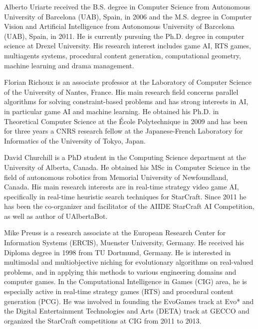 \documentclass[journal]{IEEEtran}
\begin{document}
\begin{IEEEbiographynophoto}{Alberto Uriarte}
received the B.S. degree in Computer Science from Autonomous University of Barcelona (UAB), Spain, in 2006 and the M.S. degree in Computer Vision and Artificial Intelligence from Autonomous University of Barcelona (UAB), Spain, in 2011. He is currently pursuing the Ph.D. degree in computer science at Drexel University. His research interest includes game AI, RTS games, multiagents systems, procedural content generation, computational geometry, machine learning and drama management.  
 \end{IEEEbiographynophoto}

\begin{IEEEbiographynophoto}{Florian Richoux}
   is an associate  professor at the Laboratory of  Computer Science of
   the University of Nantes,  France.  His main research field concerns
   parallel  algorithms for solving  constraint-based problems  and has
   strong  interests   in  AI,  in  particular  game   AI  and  machine
   learning. He  obtained his Ph.D. in Theoretical  Computer Science at
   the {\'E}cole Polytechnique  in 2009 and has been  for three years a
   CNRS   research  fellow  at   the  Japanese-French   Laboratory  for
   Informatics of the University of Tokyo, Japan.
 \end{IEEEbiographynophoto}
 
\begin{IEEEbiographynophoto}{David Churchill}
is a PhD student in the Computing Science department at the University of Alberta, Canada. He obtained his MSc in Computer Science in the field of autonomous robotics from Memorial University of Newfoundland, Canada. His main research interests are in real-time strategy video game AI, specifically in real-time heuristic search techniques for StarCraft. Since 2011 he has been the co-organizer and facilitator of the AIIDE StarCraft AI Competition, as well as author of UAlbertaBot. 
\end{IEEEbiographynophoto}

\begin{IEEEbiographynophoto}{Mike Preuss}
is a research associate at the European Research Center for Information Systems (ERCIS), Muenster University, Germany. He received his Diploma degree in 1998 from TU Dortmund, Germany. He is interested in multimodal and multiobjective niching for evolutionary algorithms on real-valued problems, and in applying this methods to various engineering domains and computer games. In the Computational Intelligence in Games (CIG) area, he is especially active in real-time strategy games (RTS) and procedural content generation (PCG). He was involved in founding the EvoGames track at Evo* and the Digital Entertainment Technologies and Arts (DETA) track at GECCO and organized the StarCraft competitions at CIG from 2011 to 2013.
\end{IEEEbiographynophoto}
\end{document}
